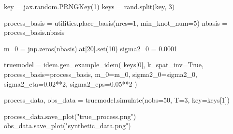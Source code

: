 \documentclass[
]{report}
\newenvironment{Shaded}{\begin{snugshade}}{\end{snugshade}}
\newcommand{\BuiltInTok}[1]{\textcolor[rgb]{0.00,0.23,0.31}{#1}}
\newcommand{\DecValTok}[1]{\textcolor[rgb]{0.68,0.00,0.00}{#1}}
\newcommand{\FloatTok}[1]{\textcolor[rgb]{0.68,0.00,0.00}{#1}}
\newcommand{\NormalTok}[1]{\textcolor[rgb]{0.00,0.23,0.31}{#1}}
\newcommand{\OperatorTok}[1]{\textcolor[rgb]{0.37,0.37,0.37}{#1}}
\newcommand{\StringTok}[1]{\textcolor[rgb]{0.13,0.47,0.30}{#1}}
\newcommand{\VariableTok}[1]{\textcolor[rgb]{0.07,0.07,0.07}{#1}}
\begin{document}
\begin{Shaded}
\begin{Highlighting}[]
\NormalTok{key }\OperatorTok{=}\NormalTok{ jax.random.PRNGKey(}\DecValTok{1}\NormalTok{)}
\NormalTok{keys }\OperatorTok{=}\NormalTok{ rand.split(key, }\DecValTok{3}\NormalTok{)}

\NormalTok{process\_basis }\OperatorTok{=}\NormalTok{ utilities.place\_basis(nres}\OperatorTok{=}\DecValTok{1}\NormalTok{, min\_knot\_num}\OperatorTok{=}\DecValTok{5}\NormalTok{)}
\NormalTok{nbasis }\OperatorTok{=}\NormalTok{ process\_basis.nbasis}

\NormalTok{m\_0 }\OperatorTok{=}\NormalTok{ jnp.zeros(nbasis).at[}\DecValTok{20}\NormalTok{].}\BuiltInTok{set}\NormalTok{(}\DecValTok{10}\NormalTok{)}
\NormalTok{sigma2\_0 }\OperatorTok{=} \FloatTok{0.0001}

\NormalTok{truemodel }\OperatorTok{=}\NormalTok{ idem.gen\_example\_idem(}
\NormalTok{    keys[}\DecValTok{0}\NormalTok{], k\_spat\_inv}\OperatorTok{=}\VariableTok{True}\NormalTok{,}
\NormalTok{    process\_basis}\OperatorTok{=}\NormalTok{process\_basis,}
\NormalTok{    m\_0}\OperatorTok{=}\NormalTok{m\_0, sigma2\_0}\OperatorTok{=}\NormalTok{sigma2\_0,}
\NormalTok{    sigma2\_eta}\OperatorTok{=}\FloatTok{0.02}\OperatorTok{**}\DecValTok{2}\NormalTok{,}
\NormalTok{    sigma2\_eps}\OperatorTok{=}\FloatTok{0.05}\OperatorTok{**}\DecValTok{2}
\NormalTok{)}

\NormalTok{process\_data, obs\_data }\OperatorTok{=}\NormalTok{ truemodel.simulate(nobs}\OperatorTok{=}\DecValTok{50}\NormalTok{, T}\OperatorTok{=}\DecValTok{3}\NormalTok{, key}\OperatorTok{=}\NormalTok{keys[}\DecValTok{1}\NormalTok{])}

\NormalTok{process\_data.save\_plot(}\StringTok{"true\_process.png"}\NormalTok{)}
\NormalTok{obs\_data.save\_plot(}\StringTok{"synthetic\_data.png"}\NormalTok{)}
\end{Highlighting}
\end{Shaded}
\end{document}
